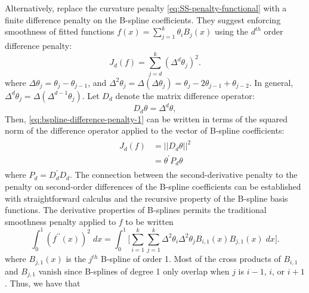 Alternatively, \cite{eilers1996flexible} replace the curvature penalty \eqref{eq:SS-penalty-functional} with a finite difference penalty on the B-spline coefficients. They suggest enforcing smoothness of fitted functions $f\left(x\right) = \sum\limits_{j=1}^k \theta_i B_j\left(x\right)$ using the $d^{th}$ order difference penalty:
\begin{equation} \label{eq:bspline-difference-penalty-1}
J_d\left( f \right) = \sum_{j=d}^k \left(\Delta^d \theta_j\right)^2.
\end{equation} 
\noindent
where $\Delta \theta_j = \theta_j - \theta_{j-1}$, and $\Delta^2 \theta_j = \Delta\left(\Delta \theta_j\right) = \theta_j - 2\theta_{j-1} + \theta_{j-2}$. In general, $\Delta^d \theta_j = \Delta\left(\Delta^{d-1} \theta_j \right)$. Let $D_d$ denote the matrix difference operator:
\[
D_d\theta = \Delta^d \theta,
\]
\noindent
Then, \eqref{eq:bspline-difference-penalty-1} can be written in terms of the squared norm of the difference operator applied to the vector of B-spline coefficients:
\begin{align} 
\begin{split} \label{eq:bspline-difference-penalty-2}
J_d\left( f \right) &= \vert \vert D_d\theta \vert \vert^2 \\
&= \theta^\prime P_d \theta
\end{split}
\end{align}
\noindent
where $P_d = D_d^\prime D_d$.  The connection between the second-derivative penalty to the penalty on second-order differences of the B-spline coefficients can be established with straightforward calculus and the recursive property of the B-spline basis functions.  The derivative properties of B-splines permits the traditional smoothness penalty applied to $f$ to be written 
\begin{equation*} \label{eq:second-derivative-bspline-penalty}
\int_0^1 \left( f^{\prime \prime}\left(x\right)\right)^2\;dx =  \int_{0}^{1}  \bigg[ \sum\limits_{i=1}^k \sum\limits_{j=1}^k \Delta^2 \theta_i \Delta^2 \theta_j B_{i,1}\left(x\right)B_{j,1}\left(x\right) \;dx\bigg]. 
\end{equation*}
\noindent
where $B_{j,1}\left(x\right)$ is the $j^{th}$ B-spline of order 1. Most of the cross products of $B_{i,1}$ and $B_{j,1}$ vanish since B-splines of degree 1 only overlap when $j$ is $i-1$, $i$, or $i+1$. Thus, we have that
